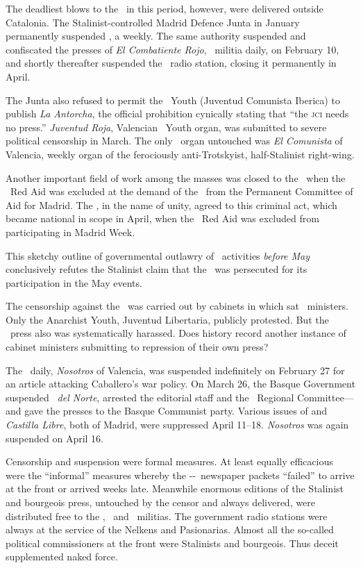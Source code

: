 The deadliest blows to the \POUM\ in this period, however, were delivered outside Catalonia. The Stalinist-controlled Madrid Defence Junta in January permanently suspended \emph{\POUM}, a weekly. The same authority suspended and confiscated the presses of \emph{El Combatiente Rojo}, \POUM\ militia daily, on February 10, and shortly thereafter suspended the \POUM\ radio station, closing it permanently in April.

The Junta also refused to permit the \POUM\ Youth (Juventud Comunista Iberica) to publish \emph{La Antorcha}, the official prohibition cynically stating that ``the \textsc{jci} needs no press.'' \emph{Juventud Roja}, Valencian \POUM\ Youth organ, was submitted to severe political censorship in March. The only \POUM\ organ untouched was \emph{El Comunista} of Valencia, weekly organ of the ferociously anti-Trotskyist, half-Stalinist right-wing.

Another important field of work among the masses was closed to the \POUM\ when the \POUM\ Red Aid was excluded at the demand of the \PSUC\ from the Permanent Committee of Aid for Madrid. The \CNT, in the name of unity, agreed to this criminal act, which became national in scope in April, when the \POUM\ Red Aid was excluded from participating in Madrid Week.

This sketchy outline of governmental outlawry of \POUM\ activities \emph{before May} conclusively refutes the Stalinist claim that the \POUM\ was persecuted for its participation in the May events.

The censorship against the \POUM\ was carried out by cabinets in which sat \CNT\ ministers. Only the Anarchist Youth, Juventud Libertaria, publicly protested. But the \CNT\ press also was systematically harassed. Does history record another instance of cabinet ministers submitting to repression of their own press?

The \FAI\ daily, \emph{Nosotros} of Valencia, was suspended indefinitely on February 27 for an article attacking Caballero’s war policy. On March 26, the Basque Government suspended \emph{\CNT\ del Norte}, arrested the editorial staff and the \CNT\ Regional Committee---and gave the presses to the Basque Communist party. Various issues of \emph{\CNT} and \emph{Castilla Libre}, both of Madrid, were suppressed April 11--18. \emph{Nosotros} was again suspended on April 16.

Censorship and suspension were formal measures. At least equal\-ly efficacious were the ``informal'' measures whereby the \CNT-\FAI-\POUM\ newspaper packets ``failed'' to arrive at the front or arrived weeks late. Meanwhile enormous editions of the Stalinist and bourgeois press, untouched by the censor and always delivered, were distributed free to the \CNT, \UGT\ and \POUM\ militias. The government radio stations were always at the service of the Nelkens and Pasionarias. Almost all the so-called political commissioners at the front were Stalinists and bourgeois. Thus deceit supplemented naked force.

